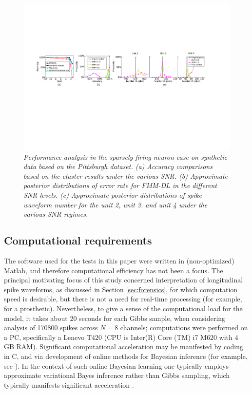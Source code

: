 \documentclass[journal]{IEEEtran}
\begin{document}
\begin{figure}[!htbp]
\centering
   \includegraphics[scale=0.70,angle=0] {figs_new/posterior_error_rate.pdf}
  \caption{\small \emph{Performance analysis in the sparsely firing neuron case on synthetic data based on the Pittsburgh dataset. (a) Accuracy comparisons based on the cluster results under the various SNR. (b) Approximate posterior distributions of error rate for FMM-DL in the different SNR levels. (c) Approximate posterior distributions of spike waveform number for the unit 2, unit 3. and unit 4 under the various SNR regimes. 
   }} \label{fig:posterior_error_rate}
\end{figure}



\subsection{Computational requirements}

The software used for the tests in this paper were written in (non-optimized) Matlab, and therefore computational efficiency has not been a focus. The principal motivating focus of this study concerned interpretation of {longitudinal} spike waveforms, as discussed in Section \ref{sec:forensics}, for which computation speed is desirable, but there is not a need for real-time processing (for example, for a prosthetic).
 Nevertheless, to give a sense of the computational load for the model, it takes about 20 seconds for each Gibbs sample, when considering analysis of 170800 spikes across $N=8$ channels; computations were performed on a PC, specifically a Lenevo T420 (CPU is Inter(R) Core (TM) i7 M620 with 4 GB RAM). Significant computational acceleration may be manifested by coding in C, and via development of online methods for Bayesian inference (for example, see \cite{Wang11}). In the context of such online Bayesian learning one typically employs approximate variational Bayes inference rather than Gibbs sampling, which typically manifests significant acceleration \cite{Wang11}.
\end{document}
